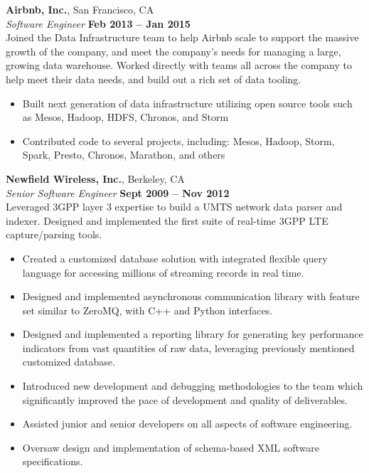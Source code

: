 \documentclass[margin,line]{resume}
\begin{document}
\begin{resume}
    \textbf{Airbnb, Inc.}, San Francisco, CA \vspace{2mm}\\\vspace{1mm}%
    \textsl{Software Engineer} \hfill \textbf{Feb 2013 -- Jan 2015}\\
    Joined the Data Infrastructure team to help Airbnb scale to support the
    massive growth of the company, and meet the company's needs for managing
    a large, growing data warehouse. Worked directly with teams all across
    the company to help meet their data needs, and build out a rich set of
    data tooling.

    \begin{itemize}
    \item Built next generation of data infrastructure utilizing open source
     tools such as Mesos, Hadoop, HDFS, Chronos, and Storm
    \item Contributed code to several projects, including: Mesos, Hadoop,
     Storm, Spark, Presto, Chronos, Marathon, and others
    \end{itemize}

    \textbf{Newfield Wireless, Inc.}, Berkeley, CA \vspace{2mm}\\\vspace{1mm}%
    \textsl{Senior Software Engineer} \hfill \textbf{Sept 2009 -- Nov 2012}\\
    Leveraged 3GPP layer 3 expertise to build a UMTS network data parser and
    indexer. Designed and implemented the first suite of real-time 3GPP LTE
    capture/parsing tools.

    \begin{itemize}
    \item Created a customized database solution with integrated flexible query language for accessing millions of streaming records in real time.
    \item Designed and implemented asynchronous communication library with feature set similar to ZeroMQ, with C++ and Python interfaces.
    \item Designed and implemented a reporting library for generating key performance indicators from vast quantities of raw data, leveraging previously mentioned customized database.
    \item Introduced new development and debugging methodologies to the team which significantly improved the pace of development and quality of deliverables.
    \item Assisted junior and senior developers on all aspects of software engineering.
    \item Oversaw design and implementation of schema-based XML software specifications.
    \end{itemize}


\end{resume}
\end{document}
